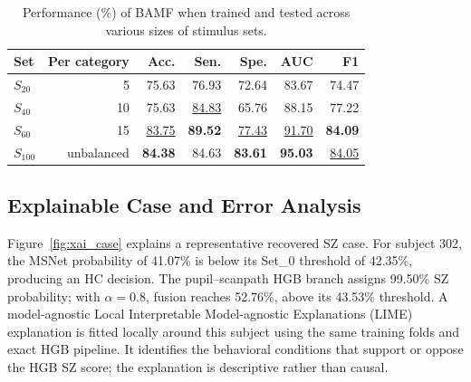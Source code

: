 \documentclass[conference,a4paper]{IEEEtran}
\begin{document}
\begin{table}[t]
\caption{Performance (\%) of BAMF when trained and tested across various sizes of stimulus sets.}
\label{tab:stimulus_count}
\centering
\small
\setlength{\tabcolsep}{5.2pt}
\begin{tabular}{lrrrrrr}
\toprule
Set & Per category & Acc. & Sen. & Spe. & AUC & F1 \\
\midrule
$S_{20}$ & 5 & 75.63 & 76.93 & 72.64 & 83.67 & 74.47 \\
$S_{40}$ & 10 & 75.63 & \underline{84.83} & 65.76 & 88.15 & 77.22 \\
$S_{60}$ & 15 & \underline{83.75} & \textbf{89.52} & \underline{77.43} & \underline{91.70} & \textbf{84.09} \\
$S_{100}$ & unbalanced & \textbf{84.38} & 84.63 & \textbf{83.61} & \textbf{95.03} & \underline{84.05} \\
\bottomrule
\end{tabular}
\end{table}

\subsection{Explainable Case and Error Analysis}
Figure~\ref{fig:xai_case} explains a representative recovered SZ case. For subject 302, the MSNet probability of 41.07\% is below its Set\_0 threshold of 42.35\%, producing an HC decision. The pupil--scanpath HGB branch assigns 99.50\% SZ probability; with $\alpha=0.8$, fusion reaches 52.76\%, above its 43.53\% threshold. A model-agnostic Local Interpretable Model-agnostic Explanations (LIME) explanation is fitted locally around this subject using the same training folds and exact HGB pipeline. It identifies the behavioral conditions that support or oppose the HGB SZ score; the explanation is descriptive rather than causal.
\end{document}
